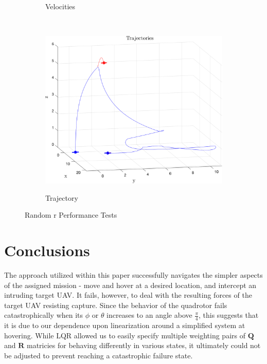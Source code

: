 \documentclass{article}
\begin{document}
\begin{multicols}{2}
\begin{figure}[H]
\begin{subfigure}[b]{0.49\columnwidth}
     \vspace{-5mm}
      \caption{Velocities}
 \end{subfigure}\\
 \bigskip
\begin{subfigure}[b]{1.0\columnwidth}
    \centering
    \includegraphics[width = 1\textwidth]{images/InterceptRandom.png}
     \label{fig:RandTraj}
     \vspace{-5mm}
     \caption{Trajectory}
 \end{subfigure}
    \caption{Random r Performance Tests}
     \label{fig:Randr}
\end{figure}

\section*{Conclusions}

The approach utilized within this paper successfully navigates the simpler aspects of the assigned mission - move and hover at a desired location, and intercept an intruding target UAV. It fails, however, to deal with the resulting forces of the target UAV resisting capture. Since the behavior of the quadrotor fails catastrophically when its $\phi$ or $\theta$ increases to an angle above $\frac{\pi}{4}$, this suggests that it is due to our dependence upon linearization around a simplified system at hovering. While LQR allowed us to easily specify multiple weighting pairs of $\boldsymbol{Q}$ and $\boldsymbol{R}$ matricies for behaving differently in various states, it ultimately could not be adjusted to prevent reaching a catastrophic failure state.


\end{multicols}
\end{document}
